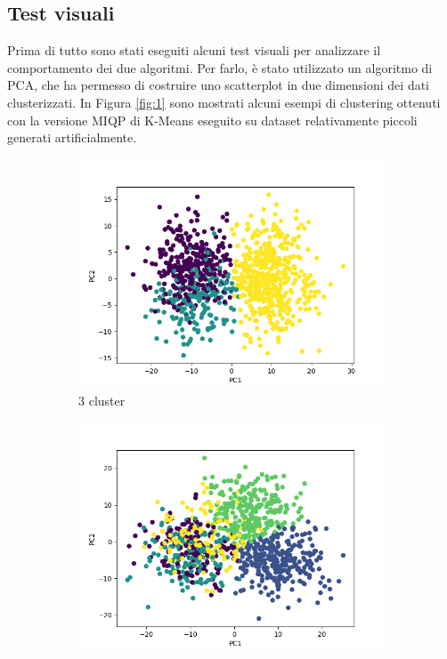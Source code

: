 \documentclass{article}
\begin{document}
    \subsection{Test visuali}
    Prima di tutto sono stati eseguiti alcuni test visuali per analizzare il comportamento dei due algoritmi. Per farlo, è stato utilizzato un algoritmo di PCA, che ha permesso di costruire uno scatterplot in due dimensioni dei dati clusterizzati. In Figura \ref{fig:1} sono mostrati alcuni esempi di clustering ottenuti con la versione MIQP di K-Means eseguito su dataset relativamente piccoli generati artificialmente.
    \begin{figure}[h]
     \centering
     \begin{subfigure}[b]{0.32\linewidth}
         \centering
         \includegraphics[width=\linewidth]{../results/plots/scatter_k3}
         \caption{3 cluster}
     \end{subfigure}
     \hfill
     \begin{subfigure}[b]{0.32\linewidth}
         \centering
         \includegraphics[width=\linewidth]{../results/plots/scatter_k5}

\end{subfigure}
\end{figure}
\end{document}
